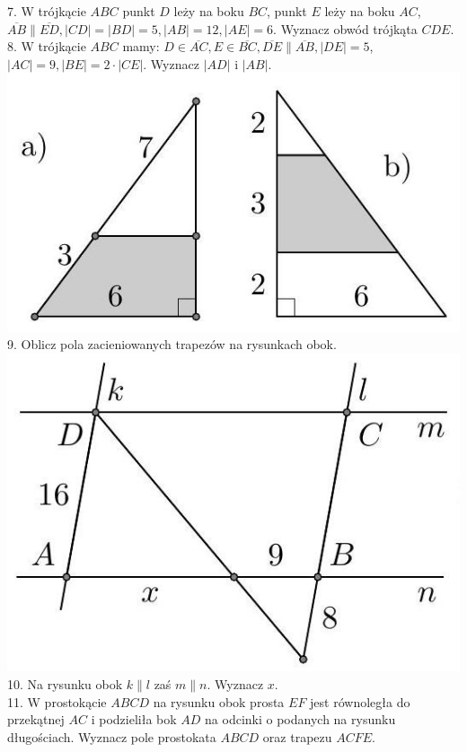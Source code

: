 \documentclass[10pt]{article}
\begin{document}
7. W trójkącie \(A B C\) punkt \(D\) leży na boku \(B C\), punkt \(E\) leży na boku \(A C\), \(\overline{A B} \| \overline{E D},|C D|=|B D|=5,|A B|=12,|A E|=6\). Wyznacz obwód trójkąta \(C D E\).\\
8. W trójkącie \(A B C\) mamy: \(D \in \overline{A C}, E \in \overline{B C}, \overline{D E} \| \overline{A B},|D E|=5\), \(|A C|=9,|B E|=2 \cdot|C E|\). Wyznacz \(|A D|\) i \(|A B|\).\\
\includegraphics[max width=\textwidth, center]{2024_11_21_e9b4faa005d5be2cc318g-009(3)}\\
9. Oblicz pola zacieniowanych trapezów na rysunkach obok.\\
\includegraphics[max width=\textwidth, center]{2024_11_21_e9b4faa005d5be2cc318g-009(1)}\\
10. Na rysunku obok \(k \| l\) zaś \(m \| n\). Wyznacz \(x\).\\
11. W prostokącie \(A B C D\) na rysunku obok prosta \(E F\) jest równoległa do przekątnej \(A C\) i podzieliła bok \(A D\) na odcinki o podanych na rysunku długościach. Wyznacz pole prostokata \(A B C D\) oraz trapezu \(A C F E\).\\
\end{document}
